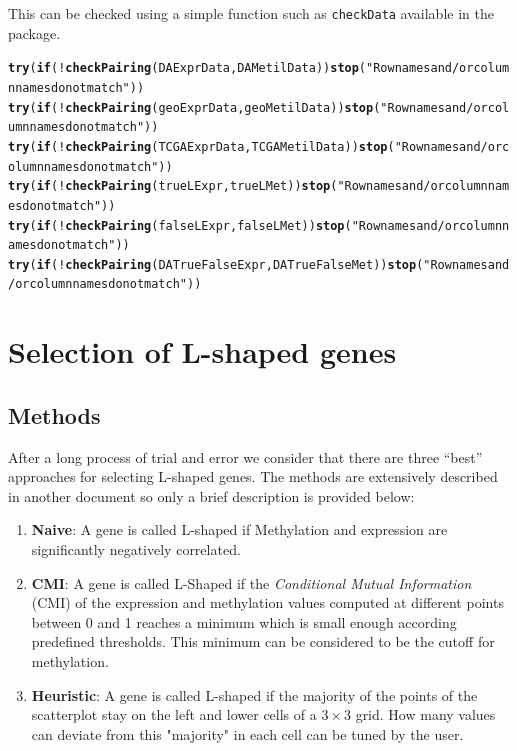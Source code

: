 \documentclass[a4paper,10pt]{article}\usepackage[]{graphicx}\usepackage[]{color}
\makeatletter
\newcommand{\hlstr}[1]{\textcolor[rgb]{0.192,0.494,0.8}{#1}}%
\newcommand{\hlopt}[1]{\textcolor[rgb]{0,0,0}{#1}}%
\newcommand{\hlstd}[1]{\textcolor[rgb]{0.345,0.345,0.345}{#1}}%
\newcommand{\hlkwa}[1]{\textcolor[rgb]{0.161,0.373,0.58}{\textbf{#1}}}%
\newcommand{\hlkwd}[1]{\textcolor[rgb]{0.737,0.353,0.396}{\textbf{#1}}}%
\newenvironment{kframe}{%
 \def\at@end@of@kframe{}%
 \ifinner\ifhmode%
  \def\at@end@of@kframe{\end{minipage}}%
  \begin{minipage}{\columnwidth}%
 \fi\fi%
 \def\FrameCommand##1{\hskip\@totalleftmargin \hskip-\fboxsep
 \colorbox{shadecolor}{##1}\hskip-\fboxsep
     \hskip-\linewidth \hskip-\@totalleftmargin \hskip\columnwidth}%
 \MakeFramed {\advance\hsize-\width
   \@totalleftmargin\z@ \linewidth\hsize
   \@setminipage}}%
 {\par\unskip\endMakeFramed%
 \at@end@of@kframe}
\newenvironment{knitrout}{}{} %
\makeatother
\begin{document}
This can be checked using a simple function such as \texttt{checkData} available in the package.
\begin{knitrout}
\color{fgcolor}\begin{kframe}
\begin{alltt}
\hlkwd{try}\hlstd{(}\hlkwa{if}\hlstd{(}\hlopt{!}\hlkwd{checkPairing}\hlstd{(DAExprData, DAMetilData))} \hlkwd{stop}\hlstd{(}\hlstr{"Row names and/or column names do not match"}\hlstd{))}
\hlkwd{try}\hlstd{(}\hlkwa{if}\hlstd{(}\hlopt{!}\hlkwd{checkPairing}\hlstd{(geoExprData, geoMetilData))} \hlkwd{stop}\hlstd{(}\hlstr{"Row names and/or column names do not match"}\hlstd{))}
\hlkwd{try}\hlstd{(}\hlkwa{if}\hlstd{(}\hlopt{!}\hlkwd{checkPairing}\hlstd{(TCGAExprData, TCGAMetilData))} \hlkwd{stop}\hlstd{(}\hlstr{"Row names and/or column names do not match"}\hlstd{))}
\hlkwd{try}\hlstd{(}\hlkwa{if}\hlstd{(}\hlopt{!}\hlkwd{checkPairing}\hlstd{(trueLExpr, trueLMet))} \hlkwd{stop}\hlstd{(}\hlstr{"Row names and/or column names do not match"}\hlstd{))}
\hlkwd{try}\hlstd{(}\hlkwa{if}\hlstd{(}\hlopt{!}\hlkwd{checkPairing}\hlstd{(falseLExpr, falseLMet))} \hlkwd{stop}\hlstd{(}\hlstr{"Row names and/or column names do not match"}\hlstd{))}
\hlkwd{try}\hlstd{(}\hlkwa{if}\hlstd{(}\hlopt{!}\hlkwd{checkPairing}\hlstd{(DATrueFalseExpr, DATrueFalseMet))} \hlkwd{stop}\hlstd{(}\hlstr{"Row names and/or column names do not match"}\hlstd{))}
\end{alltt}
\end{kframe}
\end{knitrout}

\section{Selection of L-shaped genes}
\subsection{Methods}
After a long process of trial and error we consider that there are three ``best'' approaches for selecting L-shaped genes. The methods are extensively described in another document so only a brief description is provided below:
\begin{enumerate}
  \item \textbf{Naive}: A gene is called L-shaped if Methylation and expression are significantly negatively correlated. 
  \item \textbf{CMI}: A gene is called L-Shaped if the \emph{Conditional Mutual Information} (CMI) of the expression and methylation values computed at different points between 0 and 1 reaches a minimum  which is small enough according predefined thresholds. This minimum can be considered to be the cutoff for methylation.
  \item \textbf{Heuristic}: A gene is called L-shaped if the majority of the points of the scatterplot stay on the left and lower cells of a $3\times3$ grid. How many values can deviate from this "majority" in each cell can be tuned by the user.
\end{enumerate}
\end{document}
